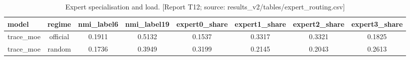 \begin{table}[htbp]
\centering
\caption{Expert specialisation and load. [Report T12; source: results\_v2/tables/expert\_routing.csv]}
\label{tab:expert_routing}
\begin{tabular}{lccccccc}
\toprule
model & regime & nmi\_label6 & nmi\_label19 & expert0\_share & expert1\_share & expert2\_share & expert3\_share \\
\midrule
trace\_moe & official & 0.1911 & 0.5132 & 0.1537 & 0.3317 & 0.3321 & 0.1825 \\
trace\_moe & random & 0.1736 & 0.3949 & 0.3199 & 0.2145 & 0.2043 & 0.2613 \\
\bottomrule
\end{tabular}
\end{table}